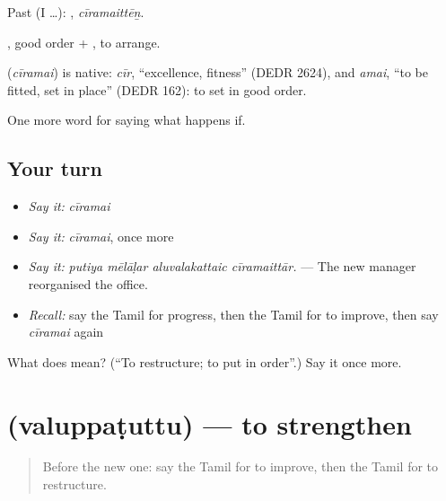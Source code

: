 Past (I …): , \emph{cīramaittēṉ}.

, good order + , to arrange.

\begin{cousinweb}
\textbf{} (\emph{cīramai}) is native: \emph{cīr}, \textquotedblleft{}excellence, fitness\textquotedblright{} (DEDR 2624), and \emph{amai}, \textquotedblleft{}to be fitted, set in place\textquotedblright{} (DEDR 162): to set in good order.
\end{cousinweb}

\begin{grammarlens}[title={What you've built}]
One more word for saying what happens if.
\end{grammarlens}

\subsection*{Your turn}
\begin{itemize}
\raggedright
  \item \emph{Say it:} \emph{cīramai}
  \item \emph{Say it:} \emph{cīramai}, once more
  \item \emph{Say it:} \emph{putiya mēlāḷar aluvalakattaic cīramaittār.} — The new manager reorganised the office.
  \item \emph{Recall:} say the Tamil for progress, then the Tamil for to improve, then say \emph{cīramai} again
\end{itemize}

\begin{tcolorbox}[breakable,colback=teal!4,colframe=teal!35!black,title={Before you move on}]
What does  mean? (\textquotedblleft{}To restructure; to put in order\textquotedblright{}.) Say it once more.
\end{tcolorbox}
\section[\texorpdfstring{\ta{வலுப்படுத்து} (valuppaṭuttu)}{வலுப்படுத்து (valuppaṭuttu)}]{ (valuppaṭuttu) — to strengthen}

\label{lesson:TA-C390-valuppatuttu}



\begin{quote}
Before the new one: say the Tamil for to improve, then the Tamil for to restructure.
\end{quote}

